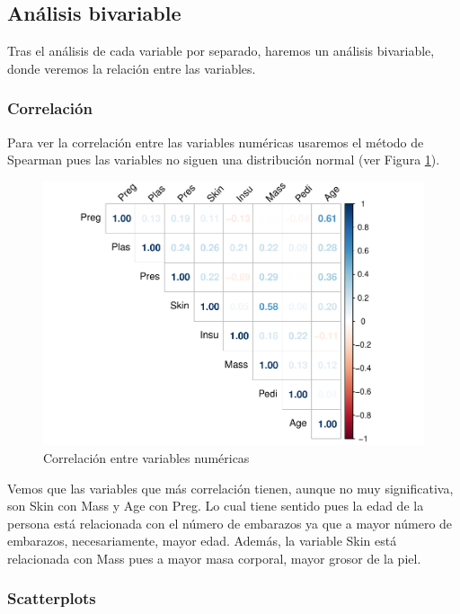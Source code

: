 \documentclass[
]{article}
\begin{document}
\hypertarget{anuxe1lisis-bivariable}{%
\subsection{Análisis bivariable}\label{anuxe1lisis-bivariable}}

Tras el análisis de cada variable por separado, haremos un análisis
bivariable, donde veremos la relación entre las variables.

\hypertarget{correlaciuxf3n}{%
\subsubsection{Correlación}\label{correlaciuxf3n}}

Para ver la correlación entre las variables numéricas usaremos el método
de Spearman pues las variables no siguen una distribución normal (ver
Figura \ref{fig:corr}).

\begin{figure}

{\centering \includegraphics[width=0.75\linewidth]{pima-clasificacion_files/figure-latex/corr-1} 

}

\caption{Correlación entre variables numéricas}\label{fig:corr}
\end{figure}

Vemos que las variables que más correlación tienen, aunque no muy
significativa, son Skin con Mass y Age con Preg. Lo cual tiene sentido
pues la edad de la persona está relacionada con el número de embarazos
ya que a mayor número de embarazos, necesariamente, mayor edad. Además,
la variable Skin está relacionada con Mass pues a mayor masa corporal,
mayor grosor de la piel.

\hypertarget{scatterplots}{%
\subsubsection{Scatterplots}\label{scatterplots}}
\end{document}
